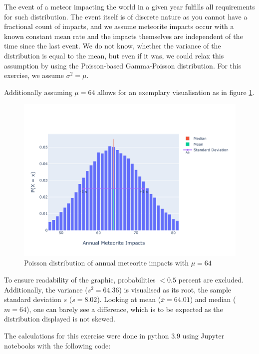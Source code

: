 The event of a meteor impacting the world in a given year fulfills all requirements for such distribution. The event itself is of discrete nature as you cannot have a fractional count of impacts, and we assume meteorite impacts occur with a known constant mean rate and the impacts themselves are independent of the time since the last event. We do not know, whether the variance of the distribution is equal to the mean, but even if it was, we could relax this assumption by using the Poisson-based Gamma-Poisson distribution. For this exercise, we assume $\sigma^2 = \mu$. 

Additionally assuming $\mu = 64$ allows for an exemplary visualisation as in figure \ref{fig:1b}.

\begin{figure}[h]
\centering
\includegraphics[width=16cm]{pics/1b.pdf}
\caption{Poisson distribution of annual meteorite impacts with $\mu = 64$}
\label{fig:1b}
\end{figure}
\FloatBarrier

To ensure readability of the graphic, probabilities $<0.5$ percent are excluded. Additionally, the variance ($s^2 = 64.36$) is visualised as its root, the sample standard deviation $s$ ($s = 8.02$). Looking at mean ($\bar{x} = 64.01$) and median ($m = 64$), one can barely see a difference, which is to be expected as the distribution displayed is not skewed. 

The calculations for this exercise were done in python 3.9 using Jupyter notebooks with the following code: 

